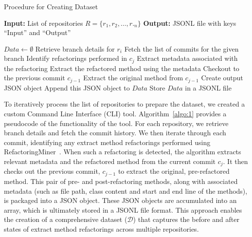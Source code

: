 \begin{algorithm}[th!]
\caption{Procedure for Creating Dataset}
\label{algo:1}
\begin{algorithmic}[1]
    \State \textbf{Input:} List of repositories $R = \{r_1, r_2, \dots, r.
    _n\}$
    \State \textbf{Output:} JSONL file with keys ``Input'' and ``Output''
    
        \State $Data \gets \emptyset$ 
            \State Retrieve branch details for $r_i$
            \State Fetch the list of commits for the given branch
                \State Identify refactorings performed in $c_j$
                    \State Extract metadata associated with the refactoring
                    \State Extract the refactored method using the metadata
                    \State Checkout to the previous commit $c_{j-1}$
                    \State Extract the original method from $c_{j-1}$
                    \State Create output JSON object 
                    \State Append this JSON object to $Data$
                \EndIf
            \EndFor
        \EndFor
        \State Store $Data$ in a JSONL file
    \EndProcedure

\end{algorithmic}
\end{algorithm}



To iteratively process the list of repositories to prepare the dataset, we created a custom Command Line Interface (CLI) tool. 
Algorithm~\ref{algo:1} provides a pseudocode of the functionality of the tool. 
For each repository, we retrieve branch details and fetch the commit history. We then iterate through each commit, identifying any extract method refactorings performed using RefactoringMiner~\cite{Tsantalis:ICSE:2018:RefactoringMiner, Tsantalis:TSE:2020:RefactoringMiner2.0}. When such a refactoring is detected, the algorithm extracts relevant metadata and the refactored method from the current commit $c_j$. It then checks out the previous commit, $c_{j-1}$ to extract the original, pre-refactored method. This pair of pre- and post-refactoring methods, along with associated metadata (such as file path, class content and start and end line of the methods), is packaged into a JSON object. These JSON objects are accumulated into an array, which is ultimately stored in a JSONL file format. This approach enables the creation of a comprehensive dataset ($\mathcal{D}$) that captures the before and after states of extract method refactorings across multiple repositories.

